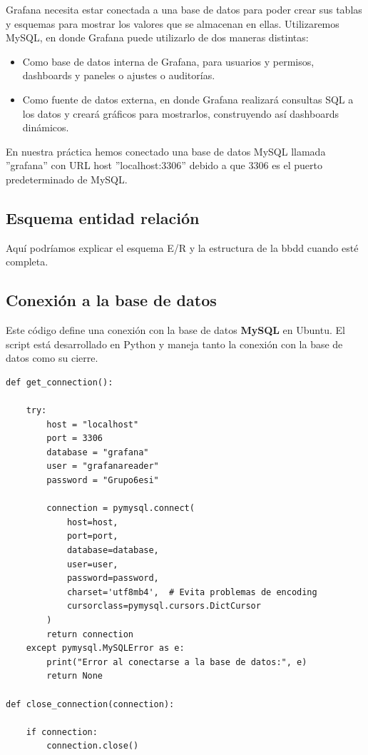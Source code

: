 \documentclass{article}
\begin{document}
Grafana necesita estar conectada a una base de datos para poder crear sus tablas y esquemas para mostrar los valores que se almacenan en ellas. Utilizaremos MySQL, en donde Grafana puede utilizarlo de dos maneras distintas:

\begin{itemize}
    \item Como base de datos interna de Grafana, para usuarios y permisos, dashboards y paneles o ajustes o auditorías.
    \item Como fuente de datos externa, en donde Grafana realizará consultas SQL a los datos y creará gráficos para mostrarlos, construyendo así dashboards dinámicos.
\end{itemize}

En nuestra práctica hemos conectado una base de datos MySQL llamada ''grafana'' con URL host ''localhost:3306'' debido a que 3306 es el puerto predeterminado de MySQL.

\newpage
\subsection{Esquema entidad relación}
Aquí podríamos explicar el esquema E/R y la estructura de la bbdd cuando esté completa.
\newpage

\subsection{Conexión a la base de datos}\label{subsec:conexión-db}
Este código define una conexión con la base de datos \textbf{MySQL} en Ubuntu. El script está desarrollado en Python y maneja tanto la conexión con la base de datos como su cierre.

\begin{verbatim}
def get_connection():

    try:
        host = "localhost"
        port = 3306
        database = "grafana"
        user = "grafanareader"
        password = "Grupo6esi"
        
        connection = pymysql.connect(
            host=host,
            port=port,
            database=database,
            user=user,
            password=password,
            charset='utf8mb4',  # Evita problemas de encoding
            cursorclass=pymysql.cursors.DictCursor
        )
        return connection
    except pymysql.MySQLError as e:
        print("Error al conectarse a la base de datos:", e)
        return None

def close_connection(connection):

    if connection:
        connection.close()
\end{verbatim}
\end{document}
